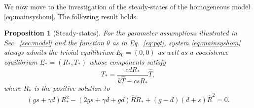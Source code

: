 \documentclass[11pt]{elsarticle}
\theoremstyle{plain}
\newtheorem{prop}[thm]{Proposition}
\theoremstyle{definition}
\theoremstyle{myremark}
\begin{document}
We now move to the investigation of the steady-states of the homogeneous model \eqref{eq:mainsyshom}. The following result holds.

\begin{prop}[Steady-states] \label{prop:equi}
For the parameter assumptions illustrated in Sec.~\ref{sec:model} and the function $\theta$ as in Eq.~\eqref{eq:pqt}, system \eqref{eq:mainsyshom} always admits the trivial equilibrium $E_0=(0,0)$ as well as a coexistence equilibrium $E_*=(R_*, T_*)$ whose components satisfy
\begin{equation} \label{eq:Tast}
    T_*=\dfrac{cdR_*}{k\hat{T}-csR_*}\hat{T},
\end{equation}
where $R_*$ is the positive solution to
\begin{equation} \label{eq:Rasteq}
(gs+\gamma d)R_*^2
 -\left( 2gs+\gamma d +gd  \right)\hat{R}R_*
+(g-d)(d+s)\hat{R}^2=0.
\end{equation}
\end{prop}
\end{document}
